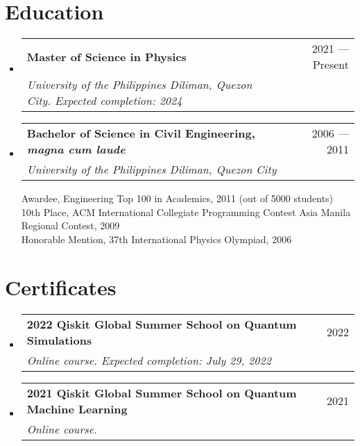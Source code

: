 \documentclass[letterpaper,11pt]{article}
\makeatletter
\newcommand{\resumeSubheading}[4]{
  \vspace{-1pt}\item
    \begin{tabular*}{0.97\textwidth}[t]{l@{\extracolsep{\fill}}r}
      \textbf{#1} & #2 \\
      \textit{\small #3} & \textit{\small #4} \\
    \end{tabular*}\vspace{-5pt}
}
\newcommand{\resumeSubheadingSubYear}[2]{
  \vspace{-1pt}\item
    \begin{tabular*}{0.97\textwidth}[t]{l@{\extracolsep{\fill}}r}
      \textbf{#1} & #2
    \end{tabular*}\vspace{1pt}
}
\newcommand{\resumeSubSubHeading}[2]{
  \begin{tabular*}{0.97\textwidth}[t]{l@{\extracolsep{\fill}}r}
    \textit{\small{#1}} & \small{#2}
  \end{tabular*}\vspace{-8pt}
}
\newcommand{\resumeSubHeadingListStart}{\begin{itemize}[leftmargin=*, label={}]}
\newcommand{\resumeSubHeadingListEnd}{\end{itemize}\vspace{-5pt}}
\newcommand{\resumeItemListStart}{\begin{itemize}}
\newcommand{\resumeItemListEnd}{\end{itemize}\vspace{-5pt}}
\makeatother
\begin{document}
\section{Education}
  \resumeSubHeadingListStart
    \resumeSubheading
      {Master of Science in Physics}{2021 --- Present}
      {\vspace{5pt}University of the Philippines Diliman, Quezon City. Expected completion: 2024}{}

    \resumeSubheading
      {Bachelor of Science in Civil Engineering, \textit{magna cum laude}}{2006 --- 2011}
      {\vspace{5pt}University of the Philippines Diliman, Quezon City}{}
      \small Awardee, Engineering Top 100 in Academics, 2011 (out of 5000 students) \\
      \small 10th Place, ACM International Collegiate Programming Contest Asia Manila Regional Contest, 2009 \\
      \small Honorable Mention, 37th International Physics Olympiad, 2006
  \resumeSubHeadingListEnd

\section{Certificates}
  \resumeSubHeadingListStart
    \resumeSubheading
      {2022 Qiskit Global Summer School on Quantum Simulations}{2022}
      {\vspace{5pt}Online course. Expected completion: July 29, 2022}{}
    \resumeSubheading
      {2021 Qiskit Global Summer School on Quantum Machine Learning}{2021}
      {\vspace{5pt}Online course.}{}
  \resumeSubHeadingListEnd



\end{document}

